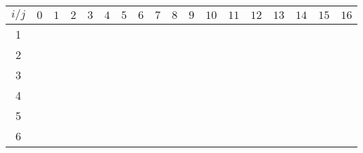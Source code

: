 \documentclass[11pt,letterpaper]{article}
\begin{document}
\begin{tabular}{|c|c|c|c|c|c|c|c|c|c|c|c|c|c|c|c|c|c|}
    \hline
    $i/j$ & $0$ & $1$ & $2$ & $3$ & $4$ & $5$ & $6$ & $7$ & $8$ & $9$ & $10$ & $11$ & $12$ & $13$ & $14$ & $15$ & $16$\\
    \hline
    
    1 & \cellcolor{green!50} & & & & & \cellcolor{green!50}& & & & & & & & & & &\\
    \hline
    2 & \cellcolor{green!50} & & & & & \cellcolor{green!50}& & & & \cellcolor{green!50}& & & & &\cellcolor{green!50} & &\\
    \hline
    3 & \cellcolor{green!50} & & &\cellcolor{green!50} & & \cellcolor{green!50}& & &\cellcolor{green!50} & \cellcolor{green!50}& & &\cellcolor{green!50} & & \cellcolor{green!50}& &\\
    \hline
    4 & \cellcolor{green!50} & & &\cellcolor{green!50} & & \cellcolor{green!50}& & &\cellcolor{green!50} & \cellcolor{green!50}& &  \cellcolor{green!50}&\cellcolor{green!50} &  \cellcolor{green!50} & \cellcolor{green!50}& & \cellcolor{green!50}\\
    \hline
    5 & \cellcolor{green!50} & &\cellcolor{green!50} &\cellcolor{green!50} & & \cellcolor{green!50}& &\cellcolor{green!50} &\cellcolor{green!50} & \cellcolor{green!50}& \cellcolor{green!50} &  \cellcolor{green!50}&\cellcolor{green!50} &  \cellcolor{green!50} & \cellcolor{green!50}& \cellcolor{green!50} & \cellcolor{green!50}\\
    \hline
    6 & \cellcolor{green!50} & &\cellcolor{green!50} &\cellcolor{green!50} & & \cellcolor{green!50}& &\cellcolor{green!50} &\cellcolor{green!50} & \cellcolor{green!50}& \cellcolor{green!50} &  \cellcolor{green!50}&\cellcolor{green!50} &  \cellcolor{green!50} & \cellcolor{green!50}& \cellcolor{green!50} & \cellcolor{green!50}\\
    \hline
\end{tabular}

\vspace{20px}
\end{document}
